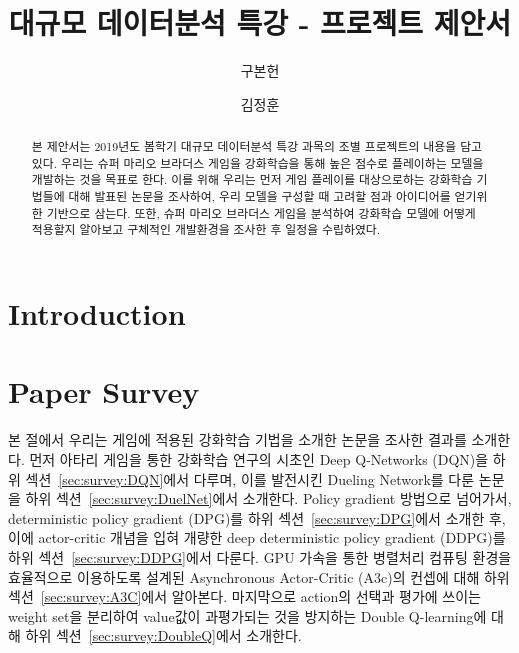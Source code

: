 \documentclass[sigconf, screen]{acmart}
\begin{document}
\title[Super Mario RL]{대규모 데이터분석 특강 - 프로젝트 제안서}

\author{구본헌}

\author{김정훈}

\begin{abstract}
본 제안서는 2019년도 봄학기 대규모 데이터분석 특강 과목의 조별 프로젝트의 내용을 담고 있다.
우리는 슈퍼 마리오 브라더스 게임을 강화학습을 통해 높은 점수로 플레이하는 모델을 개발하는 것을 목표로 한다.
이를 위해 우리는 먼저 게임 플레이를 대상으로하는 강화학습 기법들에 대해 발표된 논문을 조사하여, 우리 모델을 구성할 때 고려할 점과 아이디어를 얻기위한 기반으로 삼는다.
또한, 슈퍼 마리오 브라더스 게임을 분석하여 강화학습 모델에 어떻게 적용할지 알아보고 구체적인 개발환경을 조사한 후 일정을 수립하였다.
\end{abstract}


\maketitle
\section{Introduction}
\label{sec:intro}


\section{Paper Survey}
본 절에서 우리는 게임에 적용된 강화학습 기법을 소개한 논문을 조사한 결과를 소개한다.
먼저 아타리 게임을 통한 강화학습 연구의 시초인 Deep Q-Networks (DQN)을 하위 섹션~\ref{sec:survey:DQN}에서 다루며, 이를 발전시킨 Dueling Network를 다룬 논문을 하위 섹션~\ref{sec:survey:DuelNet}에서 소개한다.
Policy gradient 방법으로 넘어가서, deterministic policy gradient (DPG)를 하위 섹션~\ref{sec:survey:DPG}에서 소개한 후,
이에 actor-critic 개념을 입혀 개량한 deep deterministic policy gradient (DDPG)를 하위 섹션~\ref{sec:survey:DDPG}에서 다룬다.
GPU 가속을 통한 병렬처리 컴퓨팅 환경을 효율적으로 이용하도록 설계된 Asynchronous Actor-Critic (A3c)의 컨셉에 대해 하위 섹션~\ref{sec:survey:A3C}에서 알아본다.
마지막으로 action의 선택과 평가에 쓰이는 weight set을 분리하여 value값이 과평가되는 것을 방지하는 Double Q-learning에 대해 하위 섹션~\ref{sec:survey:DoubleQ}에서 소개한다.
\label{sec:survey}






\end{document}
